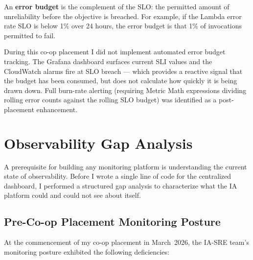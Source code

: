 An \textbf{error budget} is the complement of the SLO: the permitted
amount of unreliability before the objective is breached. For example,
if the Lambda error rate SLO is below 1\% over 24 hours, the error
budget is that 1\% of invocations permitted to fail.

During this co-op placement I did not implement automated error budget
tracking. The Grafana dashboard surfaces current SLI values and the
CloudWatch alarms fire at SLO breach --- which provides a reactive
signal that the budget has been consumed, but does not calculate how
quickly it is being drawn down. Full burn-rate alerting (requiring
Metric Math expressions dividing rolling error counts against the
rolling SLO budget) was identified as a post-placement enhancement.


\FloatBarrier

\section{Observability Gap Analysis}
\label{sec:observability_gap}


A prerequisite for building any monitoring platform is understanding the
current state of observability. Before I wrote a single line of code
for the centralized dashboard, I performed a structured gap analysis to characterize
what the IA platform could and could not see about itself.

\subsection{Pre-Co-op Placement Monitoring Posture}

At the commencement of my co-op placement in March~2026, the IA-SRE team's
monitoring posture exhibited the following deficiencies:

